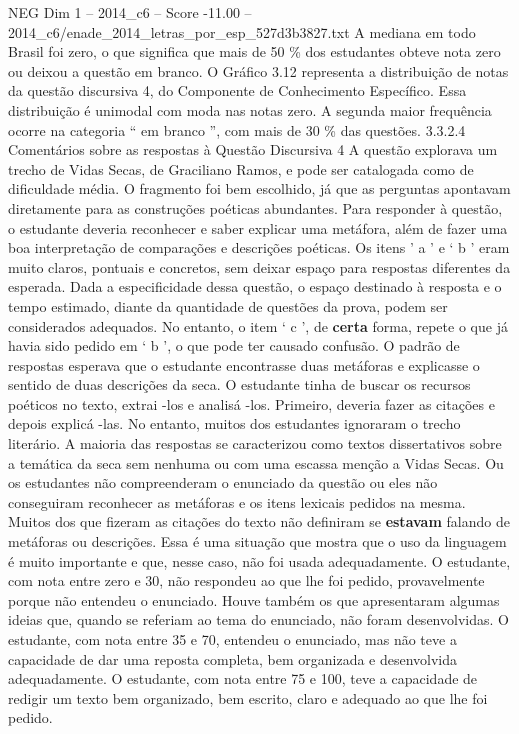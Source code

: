 \begin{textsample}{NEG Dim 1 – 2014\_c6 – Score -11.00 – 2014\_c6/enade\_2014\_letras\_por\_esp\_527d3b3827.txt}
A mediana em todo Brasil foi zero, o que significa que mais de 50 \% dos estudantes obteve nota zero ou deixou a questão em branco.
O Gráfico 3.12 representa a distribuição de notas da questão discursiva 4, do Componente de Conhecimento Específico.
Essa distribuição é unimodal com moda nas notas zero.
A segunda maior frequência ocorre na categoria “ em branco ”, com mais de 30 \% das questões. 3.3.2.4 Comentários sobre as respostas à Questão Discursiva 4 A questão explorava um trecho de Vidas Secas, de Graciliano Ramos, e pode ser catalogada como de dificuldade média.
O fragmento foi bem escolhido, já que as perguntas apontavam diretamente para as construções poéticas abundantes.
Para responder à questão, o estudante deveria reconhecer e saber explicar uma metáfora, além de fazer uma boa interpretação de comparações e descrições poéticas.
Os itens ’ a ’ e ‘ b ’ eram muito claros, pontuais e concretos, sem deixar espaço para respostas diferentes da esperada.
Dada a especificidade dessa questão, o espaço destinado à resposta e o tempo estimado, diante da quantidade de questões da prova, podem ser considerados adequados.
No entanto, o item ‘ c ’, de \textbf{certa} forma, repete o que já havia sido pedido em ‘ b ’, o que pode ter causado confusão.
O padrão de respostas esperava que o estudante encontrasse duas metáforas e explicasse o sentido de duas descrições da seca.
O estudante tinha de buscar os recursos poéticos no texto, extrai -los e analisá -los.
Primeiro, deveria fazer as citações e depois explicá -las.
No entanto, muitos dos estudantes ignoraram o trecho literário.
A maioria das respostas se caracterizou como textos dissertativos sobre a temática da seca sem nenhuma ou com uma escassa menção a Vidas Secas.
Ou os estudantes não compreenderam o enunciado da questão ou eles não conseguiram reconhecer as metáforas e os itens lexicais pedidos na mesma.
Muitos dos que fizeram as citações do texto não definiram se \textbf{estavam} falando de metáforas ou descrições.
Essa é uma situação que mostra que o uso da linguagem é muito importante e que, nesse caso, não foi usada adequadamente.
O estudante, com nota entre zero e 30, não respondeu ao que lhe foi pedido, provavelmente porque não entendeu o enunciado.
Houve também os que apresentaram algumas ideias que, quando se referiam ao tema do enunciado, não foram desenvolvidas.
O estudante, com nota entre 35 e 70, entendeu o enunciado, mas não teve a capacidade de dar uma reposta completa, bem organizada e desenvolvida adequadamente.
O estudante, com nota entre 75 e 100, teve a capacidade de redigir um texto bem organizado, bem escrito, claro e adequado ao que lhe foi pedido.

\end{textsample}
